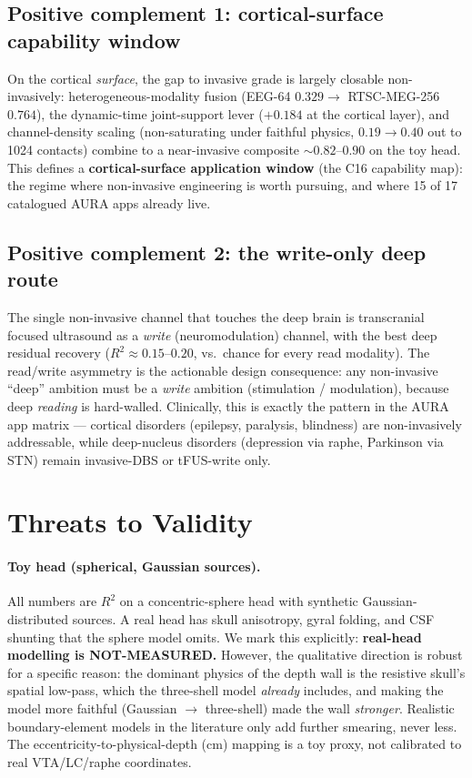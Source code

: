\documentclass[11pt]{article}
\newcommand{\Rsq}{R^{2}}
\newcommand{\greenbox}[1]{\textcolor{green!45!black}{\textbf{#1}}}
\begin{document}
\subsection{Positive complement 1: cortical-surface capability window}
On the cortical \emph{surface}, the gap to invasive grade is largely closable
non-invasively: heterogeneous-modality fusion (EEG-64 $0.329 \rightarrow$
RTSC-MEG-256 $0.764$), the dynamic-time joint-support lever ($+0.184$ at the cortical
layer), and channel-density scaling (non-saturating under faithful physics,
$0.19 \rightarrow 0.40$ out to 1024 contacts) combine to a near-invasive composite
$\sim 0.82$--$0.90$ on the toy head. This defines a \greenbox{cortical-surface
application window} (the C16 capability map): the regime where non-invasive
engineering is worth pursuing, and where 15 of 17 catalogued AURA apps already live.

\subsection{Positive complement 2: the write-only deep route}
The single non-invasive channel that touches the deep brain is transcranial focused
ultrasound as a \emph{write} (neuromodulation) channel, with the best deep residual
recovery ($\Rsq \approx 0.15$--$0.20$, vs.\ chance for every read modality). The
read/write asymmetry is the actionable design consequence: any non-invasive ``deep''
ambition must be a \emph{write} ambition (stimulation / modulation), because deep
\emph{reading} is hard-walled. Clinically, this is exactly the pattern in the AURA
app matrix --- cortical disorders (epilepsy, paralysis, blindness) are non-invasively
addressable, while deep-nucleus disorders (depression via raphe, Parkinson via STN)
remain invasive-DBS or tFUS-write only.

\section{Threats to Validity}
\label{sec:threats}

\paragraph{Toy head (spherical, Gaussian sources).} All numbers are $\Rsq$ on a
concentric-sphere head with synthetic Gaussian-distributed sources. A real head has
skull anisotropy, gyral folding, and CSF shunting that the sphere model omits. We
mark this explicitly: \textbf{real-head modelling is NOT-MEASURED.} However, the
qualitative direction is robust for a specific reason: the dominant physics of the
depth wall is the resistive skull's spatial low-pass, which the three-shell model
\emph{already} includes, and making the model more faithful (Gaussian
$\rightarrow$ three-shell) made the wall \emph{stronger}. Realistic boundary-element
models in the literature only add further smearing, never less. The
eccentricity-to-physical-depth (cm) mapping is a toy proxy, not calibrated to real
VTA/LC/raphe coordinates.
\end{document}
